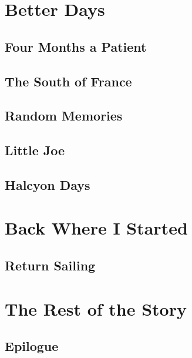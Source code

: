 \part{Better Days}\label{better-days}


\chapter{Four Months a Patient}\label{four-months-a-patient}


\chapter{The South of France}\label{the-south-of-france}


\chapter{Random Memories}\label{random-memories-2}


\chapter{Little Joe}\label{little-joe}


\chapter{Halcyon Days}\label{halcyon-days}


\part{Back Where I Started}\label{back-where-i-started}
\chapter{Return Sailing}\label{return-sailing}


\part{The Rest of the Story}\label{rest-of-the-story}
\chapter*[Epilogue]{Epilogue}\label{epilogue}


